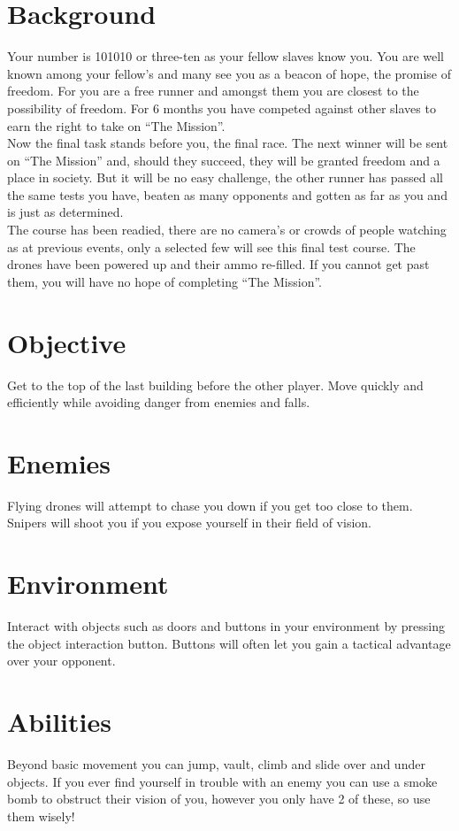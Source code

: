 \documentclass[11pt,a4paper]{article}
\begin{document}
\section*{Background}
Your number is 101010 or three-ten as your fellow slaves know you. You are well known among your fellow’s and many see you as a beacon of hope, the promise of freedom. For you are a free runner and amongst them you are closest to the possibility of freedom. For 6 months you have competed against other slaves to earn the right to take on ``The Mission''.\smallskip\\
Now the final task stands before you, the final race. The next winner will be sent on ``The Mission'' and, should they succeed, they will be granted freedom and a place in society. But it will be no easy challenge, the other runner has passed all the same tests you have, beaten as many opponents and gotten as far as you and is just as determined.\smallskip\\
The course has been readied, there are no camera’s or crowds of people watching as at previous events, only a selected few will see this final test course. The drones have been powered up and their ammo re-filled. If you cannot get past them, you will have no hope of completing ``The Mission''.
\section*{Objective}
Get to the top of the last building before the other player. Move quickly and efficiently while avoiding danger from enemies and falls.
\section*{Enemies}
Flying drones will attempt to chase you down if you get too close to them. Snipers will shoot you if you expose yourself in their field of vision.
\section*{Environment}
Interact with objects such as doors and buttons in your environment by pressing the object interaction button. Buttons will often let you gain a tactical advantage over your opponent.
\section*{Abilities}
Beyond basic movement you can jump, vault, climb and slide over and under objects. If you ever find yourself in trouble with an enemy you can use a smoke bomb to obstruct their vision of you, however you only have 2 of these, so use them wisely! 
\end{document}
